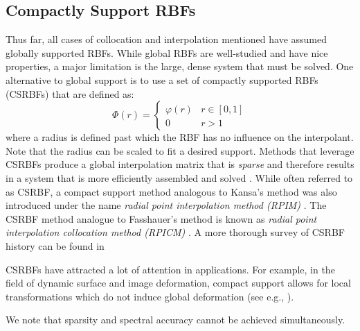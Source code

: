 \documentclass{report}
\begin{document}
{%


\subsection{Compactly Support RBFs} 

Thus far, all cases of collocation and interpolation mentioned have assumed globally supported RBFs. While global RBFs are well-studied and have nice properties, a major limitation is the large, dense system that must be solved. One alternative to global support is to use a set of compactly supported RBFs (CSRBFs) that are defined as: 
\begin{equation}
\Phi(r) = \begin{cases} \varphi(r) & r \in [0,1]\\
0 & r > 1
\end{cases}
\label{eqn:csrbf}
\end{equation}
where a radius is defined past which the RBF has no influence on the interpolant. Note that the radius can be scaled to fit a desired support. Methods that leverage CSRBFs produce a global interpolation matrix that is \emph{sparse} and therefore results in a system that is more efficiently assembled and solved \cite{Fasshauer2007}. While often referred to as CSRBF, a compact support method analogous to Kansa's method was also introduced under the name \emph{radial point interpolation method (RPIM)} \cite{Wang2002}. The CSRBF method analogue to Fasshauer's method is known as \emph{radial point interpolation collocation method (RPICM)} \cite{Liu2005}. A more thorough survey of CSRBF history can be found in \cite{Fasshauer2007}

CSRBFs have attracted a lot of attention in applications. For example, in the field of dynamic surface and image deformation, compact support allows for local transformations which do not induce global deformation (see e.g., \cite{Yang2008, Lin:2009, Correa2007}). 

We note that sparsity and spectral accuracy cannot be achieved simultaneously. 


}
\end{document}
